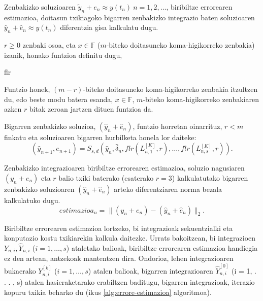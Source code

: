 Zenbakizko soluzioaren $\tilde{y}_n+e_n \approx y(t_n) \ n=1,2,\dots$, biribiltze errorearen estimazioa, doitasun txikiagoko  bigarren zenbakizko integrazio baten soluzioaren $\hat{y}_n+\hat{e}_n \approx y(t_n)$ diferentzia gisa kalkulatu dugu. 

$r\geqslant0$ zenbaki osoa, eta $x \in \mathbb{F}$ ($m$-biteko doitasuneko koma-higikorreko zenbakia) izanik, honako funtzioa definitu dugu,

\begin{algorithm}[H]
  \SetAlgoLined\DontPrintSemicolon
  \caption{flr}
\end{algorithm} 

Funtzio honek, $(m-r)$-biteko doitasuneko koma-higikorreko zenbakia itzultzen du, edo beste modu batera esanda, $x \in \mathbb{F}$, $m$-biteko koma-higikorreko zenbakiaren azken $r$ bitak zeroan jartzen dituen funtzioa da.

Bigarren zenbakizko soluzioa, $(\hat{y}_n+\hat{e}_{n})$, funtzio horretan oinarrituz, $r<m$ finkatu eta soluzioaren bigarren hurbilketa honela lor daiteke: 
\begin{equation*}
\label{eq:bkLn2}
(\hat y_{n+1}, e_{n+1}) = S_{s,d}(\hat y_n, \hat{\delta}_n, flr(L_{n,1}^{[K]},r), \dots,flr(L_{n,s}^{[K]},r)).
\end{equation*}

Zenbakizko integrazioaren biribiltze errorearen estimazioa, soluzio nagusiaren $(y_n+e_{n})$ eta $r$  balio txiki baterako (esaterako $r=3$) kalkulatutako bigarren zenbakizko soluzioaren $(\hat{y}_n+\hat{e}_{n})$ arteko diferentziaren norma bezala kalkulatuko dugu. 
\begin{equation}
estimazioa_n=\|(y_n+e_n)-(\hat{y}_n+\hat{e}_{n})\|_2.
\end{equation}

Biribiltze errorearen estimazioa lortzeko, bi integrazioak sekuentzialki eta konputazio kostu txikiarekin kalkula daitezke. Urrats bakoitzean, bi integrazioen $Y_{n,i},\hat{Y}_{n,i}$ ($i=1,\dots,s$) ataletako balioak, biribiltze errorearen estimazioa handiegia ez den artean, antzekoak mantentzen dira. Ondorioz, lehen integrazioaren bukaerako $Y_{n,i}^{[k]}$ ($i=1,\dots,s$) atalen balioak, bigarren integrazioaren $\hat{Y}_{n,i}^{[0]}$ (i = 1, . . . , s) atalen hasieraketarako erabiltzen baditugu, bigarren integrazioak, iterazio kopuru txikia beharko du (ikus \ref{alg:errore-estimazioa} algoritmoa).  

